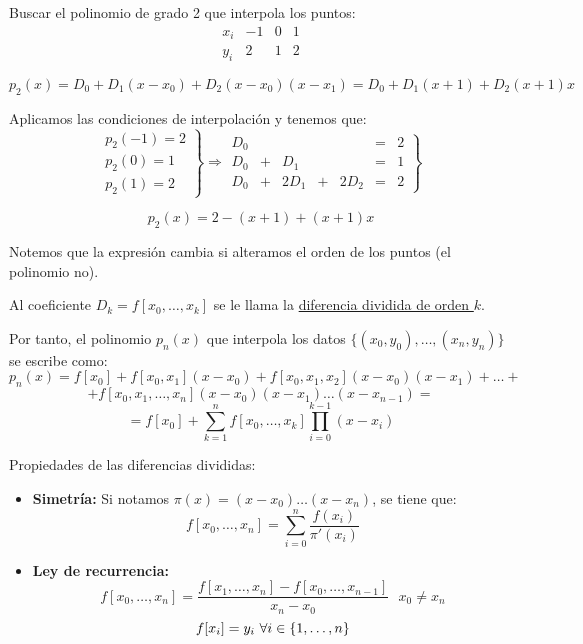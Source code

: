\bigskip
\begin{ejemplo}
Buscar el polinomio de grado 2 que interpola los puntos:
$$\begin{array}{c|ccc}
        x_i & -1 & 0 & 1 \\
        \hline
        y_i & 2  & 1 & 2
    \end{array}$$

$$p_2(x)=D_0 + D_1(x-x_0) + D_2(x-x_0)(x-x_1) = D_0 + D_1(x+1)+D_2(x+1)x$$

Aplicamos las condiciones de interpolación y tenemos que:
$$\left.\begin{array}{l}
        p_2(-1)=2 \\
        p_2(0)=1  \\
        p_2(1)=2
    \end{array}\right\} \Rightarrow
    \left. \begin{array}{ccccccc}
        D_0 &   &      &   &      & = & 2 \\
        D_0 & + & D_1  &   &      & = & 1 \\
        D_0 & + & 2D_1 & + & 2D_2 & = & 2
    \end{array}\right\}$$

$$p_2(x)=2-(x+1)+(x+1)x$$
\end{ejemplo}

Notemos que la expresión cambia si alteramos el orden de los puntos (el polinomio no).

\begin{definicion}
    Al coeficiente $D_k = f[x_0,\ldots, x_k]$ se le llama la \underline{diferencia dividida de orden $k$}.
\end{definicion}

\noindent
Por tanto, el polinomio $p_n(x)$ que interpola los datos $\{(x_0,y_0),\ldots, (x_n,y_n)\}$ se escribe como:
$$p_n(x) = f[x_0] + f[x_0,x_1](x-x_0) + f[x_0,x_1,x_2](x-x_0)(x-x_1) + \ldots + $$
$$ + f[x_0,x_1, \ldots, x_n](x-x_0)(x-x_1)\ldots(x-x_{n-1}) = $$
$$= f[x_0] + \sum_{k=1}^n f[x_0, \ldots, x_k] \prod_{i=0}^{k-1}(x-x_i)$$

\noindent
Propiedades de las diferencias divididas:
\begin{itemize}
    \item \textbf{Simetría:} Si notamos $\pi(x)=(x-x_0)\ldots(x-x_n)$, se tiene que:
          $$f[x_0, \ldots, x_n] = \sum_{i=0}^n \dfrac{f(x_i)}{\pi'(x_i)}$$
    \item \textbf{Ley de recurrencia:}
          $$f[x_0,\ldots, x_n] = \dfrac{f[x_1,\ldots,x_n]-f[x_0,\ldots,x_{n-1}]}{x_n-x_0} ~~~x_0 \neq x_n$$
          $$f[x_i] = y_i~\forall i \in \{1, \ldots, n\}$$
\end{itemize}

